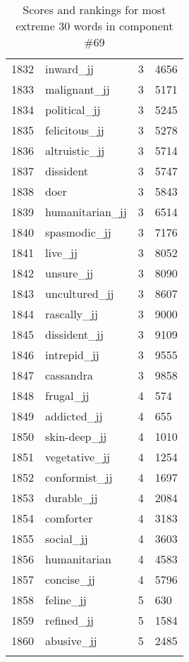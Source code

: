\begin{longtable}[!htbp]{| rlr@{.}l |}
    1832 & inward\_jj & 3 & 4656 \\
    1833 & malignant\_jj & 3 & 5171 \\
    1834 & political\_jj & 3 & 5245 \\
    1835 & felicitous\_jj & 3 & 5278 \\
    1836 & altruistic\_jj & 3 & 5714 \\
    1837 & dissident & 3 & 5747 \\
    1838 & doer & 3 & 5843 \\
    1839 & humanitarian\_jj & 3 & 6514 \\
    1840 & spasmodic\_jj & 3 & 7176 \\
    1841 & live\_jj & 3 & 8052 \\
    1842 & unsure\_jj & 3 & 8090 \\
    1843 & uncultured\_jj & 3 & 8607 \\
    1844 & rascally\_jj & 3 & 9000 \\
    1845 & dissident\_jj & 3 & 9109 \\
    1846 & intrepid\_jj & 3 & 9555 \\
    1847 & cassandra & 3 & 9858 \\
    1848 & frugal\_jj & 4 & 574 \\
    1849 & addicted\_jj & 4 & 655 \\
    1850 & skin-deep\_jj & 4 & 1010 \\
    1851 & vegetative\_jj & 4 & 1254 \\
    1852 & conformist\_jj & 4 & 1697 \\
    1853 & durable\_jj & 4 & 2084 \\
    1854 & comforter & 4 & 3183 \\
    1855 & social\_jj & 4 & 3603 \\
    1856 & humanitarian & 4 & 4583 \\
    1857 & concise\_jj & 4 & 5796 \\
    1858 & feline\_jj & 5 & 630 \\
    1859 & refined\_jj & 5 & 1584 \\
    1860 & abusive\_jj & 5 & 2485 \\
    \hline
    \caption{Scores and rankings for most extreme 30 words in component \#69} \\
\end{longtable}
